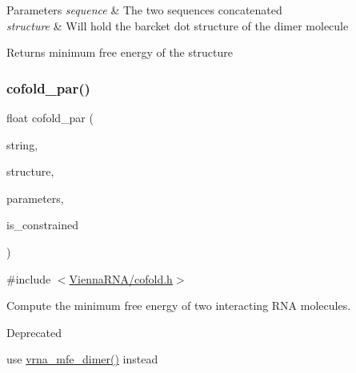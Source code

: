 \begin{DoxyParams}{Parameters}
{\em sequence} & The two sequences concatenated \\
\hline
{\em structure} & Will hold the barcket dot structure of the dimer molecule \\
\hline
\end{DoxyParams}
\begin{DoxyReturn}{Returns}
minimum free energy of the structure 
\end{DoxyReturn}
\mbox{\label{group__mfe__cofold_ga7612cfeeb1b793f1e4179b1eb53df1f3}} 
\subsubsection{\texorpdfstring{cofold\+\_\+par()}{cofold\_par()}}
{\footnotesize\ttfamily float cofold\+\_\+par (\begin{DoxyParamCaption}\item[{const char $\ast$}]{string,  }\item[{char $\ast$}]{structure,  }\item[{\mbox{\hyperlink{group__energy__parameters_ga8a69ca7d787e4fd6079914f5343a1f35}{vrna\+\_\+param\+\_\+t}} $\ast$}]{parameters,  }\item[{int}]{is\+\_\+constrained }\end{DoxyParamCaption})}



{\ttfamily \#include $<$\mbox{\hyperlink{cofold_8h}{Vienna\+R\+N\+A/cofold.\+h}}$>$}



Compute the minimum free energy of two interacting R\+NA molecules. 

\begin{DoxyRefDesc}{Deprecated}
\item[\mbox{\hyperlink{deprecated__deprecated000031}{Deprecated}}]use \mbox{\hyperlink{group__mfe__cofold_gaab22d10c1190f205f16a77cab9d5d3ee}{vrna\+\_\+mfe\+\_\+dimer()}} instead\end{DoxyRefDesc}
\mbox{\label{group__mfe__cofold_gaafb33d7473eb9af9d1b168ca8761c41a}} 
